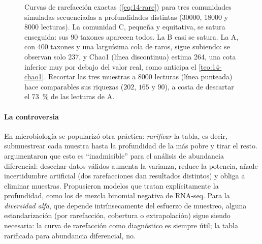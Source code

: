 
\begin{figure}[t]
\centering
{}
\caption[Curvas de rarefacción]{Curvas de rarefacción exactas (\cref{eq:14-rare}) para tres comunidades simuladas secuenciadas a profundidades distintas (\num{30000}, \num{18000} y \num{8000} lecturas). La comunidad C, pequeña y equitativa, se satura enseguida: sus 90 taxones aparecen todos. La B casi se satura. La A, con 400 taxones y una larguísima cola de raros, sigue subiendo: se observan solo 237, y Chao1 (línea discontinua) estima 264, una cota inferior muy por debajo del valor real, como anticipa el \cref{teo:14-chao1}. Recortar las tres muestras a \num{8000} lecturas (línea punteada) hace comparables sus riquezas ($202$, $165$ y $90$), a costa de descartar el \SI{73}{\percent} de las lecturas de A.}
\label{fig:14-rare}
\end{figure}

\paragraph{La controversia} En microbiología se popularizó otra práctica: \emph{rarificar} la tabla, es decir, submuestrear cada muestra hasta la profundidad de la más pobre y tirar el resto. \textcite{c14-mcmurdie2014} argumentaron que esto es ``inadmisible'' para el análisis de abundancia diferencial: desechar datos válidos aumenta la varianza, reduce la potencia, añade incertidumbre artificial (dos rarefacciones dan resultados distintos) y obliga a eliminar muestras. Propusieron modelos que tratan explícitamente la profundidad, como los de mezcla binomial negativa de RNA-seq. Para la \emph{diversidad alfa}, que depende intrínsecamente del esfuerzo de muestreo, alguna estandarización (por rarefacción, cobertura o extrapolación) sigue siendo necesaria: la curva de rarefacción como diagnóstico es siempre útil; la tabla rarificada para abundancia diferencial, no.

